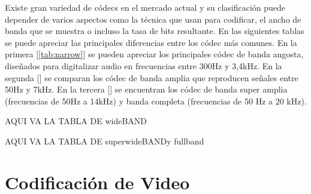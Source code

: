 Existe gran variedad de códecs en el mercado actual y su clasificación puede depender de varios aspectos como la técnica que usan para codificar, el ancho de banda que se muestra o incluso la tasa de bits resultante. En las siguientes tablas se puede apreciar las principales diferencias entre los códec más comunes. En la primera [\ref{tab:narrow}] se pueden apreciar los principales códec de banda angosta, diseñados para digitalizar audio en frecuencias entre 300Hz y 3,4kHz. En la segunda [] se comparan los códec de banda amplia que reproducen señales entre 50Hz y 7kHz. En la tercera [] se encuentran los códec de banda super amplia (frecuencias de 50Hz a 14kHz) y banda completa (frecuencias de 50 Hz a 20 kHz).

AQUI VA LA TABLA DE wideBAND

AQUI VA LA TABLA DE superwideBANDy fullband


\section{Codificación de Video}

	